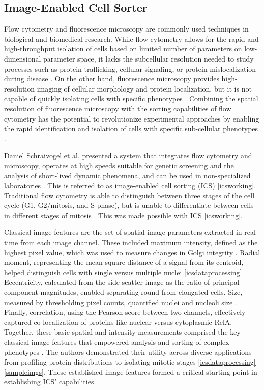 \documentclass[12pt,a4paper]{article}
\begin{document}
\subsection{Image-Enabled Cell Sorter}
Flow cytometry and fluorescence microscopy are commonly used techniques in biological and biomedical research. While flow cytometry allows for the rapid and high-throughput isolation of cells based on limited number of parameters on low-dimensional parameter space, it lacks the subcellular resolution needed to study processes such as protein trafficking, cellular signaling, or protein mislocalization during disease \cite{cossarizza_chang_radbruch_acs_adam_adamklages_agace_aghaeepour_akdis_allez_et_al._2019}. On the other hand, fluorescence microscopy provides high-resolution imaging of cellular morphology and protein localization, but it is not capable of quickly isolating cells with specific phenotypes \cite{Espina2006-iv}. Combining the spatial resolution of fluorescence microscopy with the sorting capabilities of flow cytometry has the potential to revolutionize experimental approaches by enabling the rapid identification and isolation of cells with specific sub-cellular phenotypes \cite{doi:10.1126/science.abj3013}.

Daniel Schraivogel et al. presented a system that integrates flow cytometry and microscopy, operates at high speeds suitable for genetic screening and the analysis of short-lived dynamic phenomena, and can be used in non-specialized laboratories \cite{doi:10.1126/science.abj3013}. This is referred to as image-enabled cell sorting (ICS) \ref{icsworking}. Traditional flow cytometry is able to distinguish between three stages of the cell cycle (G1, G2/mitosis, and S phase), but is unable to differentiate between cells in different stages of mitosis \cite{doi:10.1126/science.abj3013}. This was made possible with ICS \ref{icsworking}.

Classical image features are the set of spatial image parameters extracted in real-time from each image channel. These included maximum intensity, defined as the highest pixel value, which was used to measure changes in Golgi integrity \cite{doi:10.1126/science.abj3013}. Radial moment, representing the mean-square distance of a signal from its centroid, helped distinguish cells with single versus multiple nuclei \ref{icsdataprocessing}. Eccentricity, calculated from the side scatter image as the ratio of principal component magnitudes, enabled separating round from elongated cells. Size, measured by thresholding pixel counts, quantified nuclei and nucleoli size \cite{doi:10.1126/science.abj3013}. Finally, correlation, using the Pearson score between two channels, effectively captured co-localization of proteins like nuclear versus cytoplasmic RelA. Together, these basic spatial and intensity measurements comprised the key classical image features that empowered analysis and sorting of complex phenotypes \cite{doi:10.1126/science.abj3013}. The authors demonstrated their utility across diverse applications from profiling protein distributions to isolating mitotic stages \ref{icsdataprocessing} \ref{sampleimgs}. These established image features formed a critical starting point in establishing ICS' capabilities.
\end{document}
